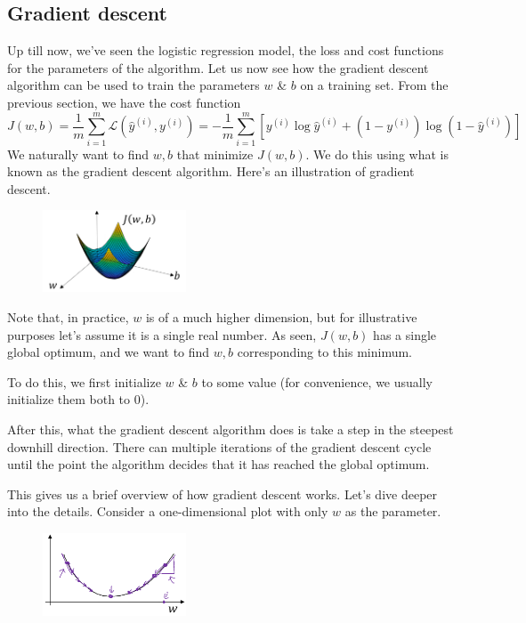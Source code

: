 \documentclass{article}[a4paper,12pt]
\theoremstyle{definition}
\newcommand{\Lagr}{\mathcal{L}}
\begin{document}
\subsection{Gradient descent}
Up till now, we've seen the logistic regression model, the loss and cost functions for the parameters of the algorithm. Let us now see how the gradient descent algorithm can be used to train the parameters $w$ \& $b$ on a training set. From the previous section, we have the cost function
$$J(w,b)=\dfrac{1}{m}\sum_{i=1}^{m}\Lagr(\hat{y}^{(i)},y^{(i)})=-\dfrac{1}{m}\sum_{i=1}^{m}\left[y^{(i)}\log\hat{y}^{(i)}+(1-y^{(i)})\log(1-\hat{y}^{(i)})\right]$$
We naturally want to find $w, b$ that minimize $J(w,b)$. We do this using what is known as the gradient descent algorithm. Here's an illustration of gradient descent.
\begin{figure}
\centering \includegraphics[width=0.38\textwidth]{gradient_descent.png}
\end{figure}
\vspace{6pt}

Note that, in practice, $w$ is of a much higher dimension, but for illustrative purposes let's assume it is a single real number. As seen, $J(w,b)$ has a single global optimum, and we want to find $w,b$ corresponding to this minimum.
\vspace{6pt}

To do this, we first initialize $w$ \& $b$ to some value (for convenience, we usually initialize them both to 0).
\vspace{6pt}

After this, what the gradient descent algorithm does is take a step in the steepest downhill direction. There can multiple iterations of the gradient descent cycle until the point the algorithm decides that it has reached the global optimum. 
\vspace{6pt}

This gives us a brief overview of how gradient descent works. Let's dive deeper into the details. Consider a one-dimensional plot with only $w$ as the parameter.
\begin{figure}
\centering \includegraphics[width=0.38\textwidth]{1d_convex_plot.png}
\end{figure}
\vspace{6pt}
\end{document}
